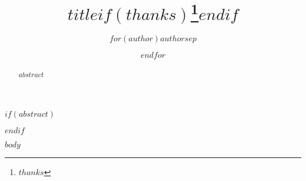 \documentclass[
$if(fontsize)$
  $fontsize$,
$endif$
$if(lang)$
  $babel-lang$,
$endif$
$if(papersize)$
  $papersize$paper,
$endif$
$if(beamer)$
  ignorenonframetext,
$if(handout)$
  handout,
$endif$
$if(aspectratio)$
  aspectratio=$aspectratio$,
$endif$
$endif$
$for(classoption)$
  $classoption$$sep$,
$endfor$
]{$documentclass$}
\title{$title$$if(thanks)$\thanks{$thanks$}$endif$}
\author{$for(author)$$author$$sep$ \and $endfor$}
\begin{document}
    \maketitle
    $if(abstract)$
    \begin{abstract}
        $abstract$
    \end{abstract}
    $endif$

    $body$


\end{document}
